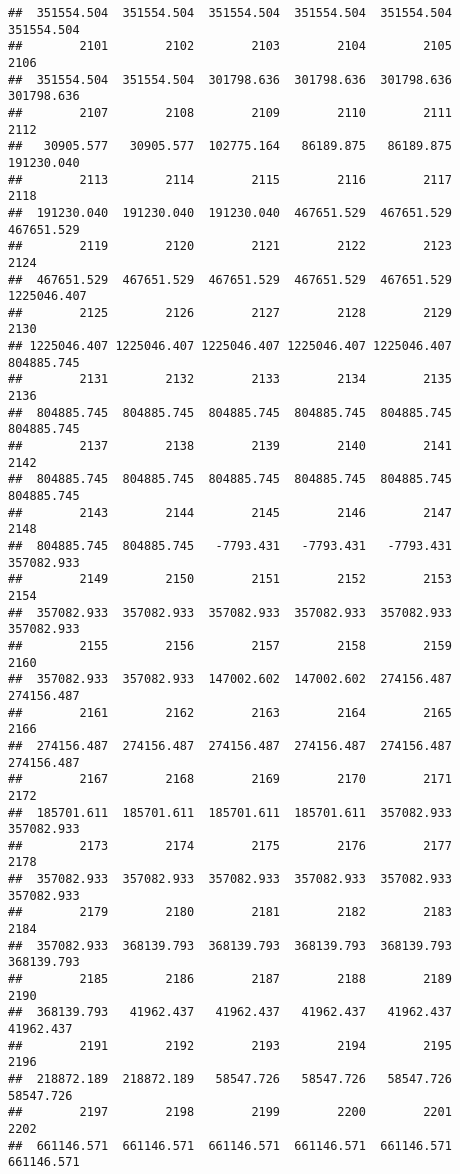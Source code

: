 \documentclass[
]{book}
\begin{document}
\begin{verbatim}
##  351554.504  351554.504  351554.504  351554.504  351554.504  351554.504 
##        2101        2102        2103        2104        2105        2106 
##  351554.504  351554.504  301798.636  301798.636  301798.636  301798.636 
##        2107        2108        2109        2110        2111        2112 
##   30905.577   30905.577  102775.164   86189.875   86189.875  191230.040 
##        2113        2114        2115        2116        2117        2118 
##  191230.040  191230.040  191230.040  467651.529  467651.529  467651.529 
##        2119        2120        2121        2122        2123        2124 
##  467651.529  467651.529  467651.529  467651.529  467651.529 1225046.407 
##        2125        2126        2127        2128        2129        2130 
## 1225046.407 1225046.407 1225046.407 1225046.407 1225046.407  804885.745 
##        2131        2132        2133        2134        2135        2136 
##  804885.745  804885.745  804885.745  804885.745  804885.745  804885.745 
##        2137        2138        2139        2140        2141        2142 
##  804885.745  804885.745  804885.745  804885.745  804885.745  804885.745 
##        2143        2144        2145        2146        2147        2148 
##  804885.745  804885.745   -7793.431   -7793.431   -7793.431  357082.933 
##        2149        2150        2151        2152        2153        2154 
##  357082.933  357082.933  357082.933  357082.933  357082.933  357082.933 
##        2155        2156        2157        2158        2159        2160 
##  357082.933  357082.933  147002.602  147002.602  274156.487  274156.487 
##        2161        2162        2163        2164        2165        2166 
##  274156.487  274156.487  274156.487  274156.487  274156.487  274156.487 
##        2167        2168        2169        2170        2171        2172 
##  185701.611  185701.611  185701.611  185701.611  357082.933  357082.933 
##        2173        2174        2175        2176        2177        2178 
##  357082.933  357082.933  357082.933  357082.933  357082.933  357082.933 
##        2179        2180        2181        2182        2183        2184 
##  357082.933  368139.793  368139.793  368139.793  368139.793  368139.793 
##        2185        2186        2187        2188        2189        2190 
##  368139.793   41962.437   41962.437   41962.437   41962.437   41962.437 
##        2191        2192        2193        2194        2195        2196 
##  218872.189  218872.189   58547.726   58547.726   58547.726   58547.726 
##        2197        2198        2199        2200        2201        2202 
##  661146.571  661146.571  661146.571  661146.571  661146.571  661146.571 

\end{verbatim}
\end{document}
